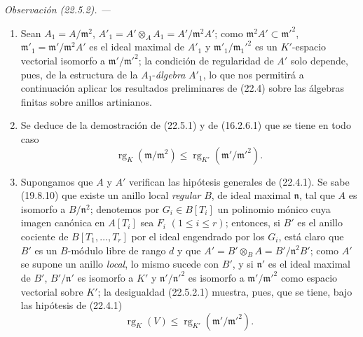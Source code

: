 \documentclass[10pt,oneside]{book}
\makeatletter
\newcommand{\setmanualcurrentlabel}[1]{\def\@currentlabel{#1}}
\newcommand{\oldpage}[2][]{%
  \setcounter{footnote}{0}%
  \marginpar{\scriptsize\textbf{#1}~|~#2}\ignorespaces}
\newenvironment{remark}[1][]{%
  \setmanualcurrentlabel{#1}\par\medskip\noindent\itshape Observación (#1). ---\ }{\par}
\makeatother
\begin{document}
\begin{remark}[22.5.2]
\label{0.22.5.2-es}
\begin{enumerate}
  \item[\rm(i)] Sean $A_1=A/\mathfrak m^2$,
  $A'_1=A'\otimes_AA_1=A'/\mathfrak m^2A'$; como
  $\mathfrak m^2A'\subset\mathfrak m'^2$,
  $\mathfrak m'_1=\mathfrak m'/\mathfrak m^2A'$ es el ideal maximal de $A'_1$
  y $\mathfrak m'_1/\mathfrak m_1'^2$ es un $K'$-espacio vectorial isomorfo
  a $\mathfrak m'/\mathfrak m'^2$; la condición de regularidad de $A'$ solo
  depende, pues, de la estructura de la $A_1$-\emph{álgebra} $A'_1$, lo que nos
  permitirá a continuación aplicar los resultados preliminares de (22.4) sobre
  las álgebras finitas sobre anillos artinianos.
  \item[\rm(ii)] Se deduce de la demostración de (22.5.1) y de (16.2.6.1)
  que se tiene en todo caso
  \begin{equation}
  \label{0.22.5.2.1-es}
    \operatorname{rg}_K(\mathfrak m/\mathfrak m^2)
    \leqslant\operatorname{rg}_{K'}(\mathfrak m'/\mathfrak m'^2).
    \tag{22.5.2.1}
  \end{equation}

  \oldpage[0\textsubscript{IV-1}]{202}

  \item[\rm(iii)] Supongamos que $A$ y $A'$ verifican las hipótesis generales
  de (22.4.1). Se sabe (19.8.10) que existe un anillo local \emph{regular}
  $B$, de ideal maximal $\mathfrak n$, tal que $A$ es isomorfo a
  $B/\mathfrak n^2$; denotemos por $G_i\in B[T_i]$ un polinomio mónico cuya
  imagen canónica en $A[T_i]$ sea $F_i$ $(1\leqslant i\leqslant r)$;
  entonces, si $B'$ es el anillo cociente de $B[T_1,\ldots,T_r]$ por el ideal
  engendrado por los $G_i$, está claro que $B'$ es un $B$-módulo libre de rango
  $d$ y que $A'=B'\otimes_BA=B'/\mathfrak n^2B'$; como $A'$ se supone un
  anillo \emph{local}, lo mismo sucede con $B'$, y si $\mathfrak n'$ es el ideal
  maximal de $B'$, $B'/\mathfrak n'$ es isomorfo a $K'$ y
  $\mathfrak n'/\mathfrak n'^2$ es isomorfo a $\mathfrak m'/\mathfrak m'^2$ como
  espacio vectorial sobre $K'$; la desigualdad (22.5.2.1) muestra, pues, que
  se tiene, bajo las hipótesis de (22.4.1)
  \begin{equation}
  \label{0.22.5.2.2-es}
    \operatorname{rg}_K(V)\leqslant\operatorname{rg}_{K'}(\mathfrak m'/\mathfrak m'^2).
    \tag{22.5.2.2}
  \end{equation}
\end{enumerate}
\end{remark}
\end{document}
